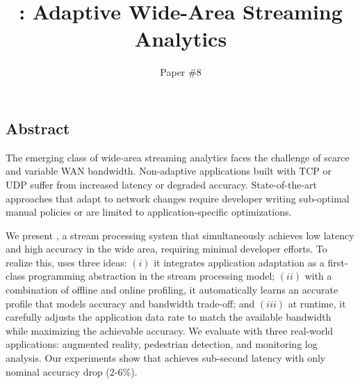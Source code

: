 \documentclass[twocolumn, 9pt]{article}
\begin{document}
\title{\sysname{}: Adaptive Wide-Area Streaming Analytics}
\author{Paper \#8}
\date{}
\maketitle

\subsection*{Abstract}

The emerging class of wide-area streaming analytics faces the challenge of
scarce and variable WAN bandwidth. Non-adaptive applications built with TCP or
UDP suffer from increased latency or degraded accuracy. State-of-the-art
approaches that adapt to network changes require developer writing sub-optimal
manual policies or are limited to application-specific optimizations.

We present \sysname{}, a stream processing system that simultaneously achieves
low latency and high accuracy in the wide area, requiring minimal developer
efforts. To realize this, \sysname{} uses three ideas: $(i)$ it integrates
application adaptation as a first-class programming abstraction in the stream
processing model; $(ii)$ with a combination of offline and online profiling, it
automatically learns an accurate profile that models accuracy and bandwidth
trade-off; and $(iii)$ at runtime, it carefully adjusts the application data
rate to match the available bandwidth while maximizing the achievable
accuracy. We evaluate \sysname{} with three real-world applications: augmented
reality, pedestrian detection, and monitoring log analysis. Our experiments show
that \sysname{} achieves sub-second latency with only nominal accuracy drop
(2-6\%).










% 

{\footnotesize 
}

% 
\end{document}
